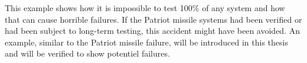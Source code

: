This example shows how it is impossible to test 100\% of any system and how that can cause horrible failures. If the Patriot missile systems had been verified or had been subject to long-term testing, this accident might have been avoided. An example, similar to the Patriot missile failure, will be introduced in this thesis and will be verified to show potentiel failures.




